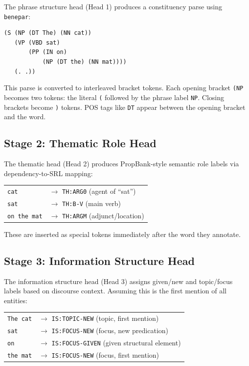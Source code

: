 \documentclass[11pt]{article}
\begin{document}
The phrase structure head (Head 1) produces a constituency parse 
using \texttt{benepar}:

\begin{small}
\begin{verbatim}
(S (NP (DT The) (NN cat))
   (VP (VBD sat)
       (PP (IN on)
           (NP (DT the) (NN mat))))
   (. .))
\end{verbatim}
\end{small}

This parse is converted to interleaved bracket tokens. Each opening 
bracket \texttt{(NP} becomes two tokens: the literal \texttt{(} 
followed by the phrase label \texttt{NP}. Closing brackets become 
\texttt{)} tokens. POS tags like \texttt{DT} appear between the 
opening bracket and the word.

\subsection*{Stage 2: Thematic Role Head}

The thematic head (Head 2) produces PropBank-style semantic role 
labels via dependency-to-SRL mapping:

\begin{small}
\begin{tabular}{@{}ll@{}}
\texttt{cat}  & $\to$ \texttt{TH:ARG0} (agent of ``sat'') \\
\texttt{sat}  & $\to$ \texttt{TH:B-V} (main verb) \\
\texttt{on the mat} & $\to$ \texttt{TH:ARGM} (adjunct/location) \\
\end{tabular}
\end{small}

These are inserted as special tokens immediately after the word 
they annotate.

\subsection*{Stage 3: Information Structure Head}

The information structure head (Head 3) assigns given/new and 
topic/focus labels based on discourse context. Assuming this is the 
first mention of all entities:

\begin{small}
\begin{tabular}{@{}ll@{}}
\texttt{The cat} & $\to$ \texttt{IS:TOPIC-NEW} (topic, first mention) \\
\texttt{sat}     & $\to$ \texttt{IS:FOCUS-NEW} (focus, new predication) \\
\texttt{on}      & $\to$ \texttt{IS:FOCUS-GIVEN} (given structural element) \\
\texttt{the mat} & $\to$ \texttt{IS:FOCUS-NEW} (focus, first mention) \\
\end{tabular}
\end{small}
\end{document}
